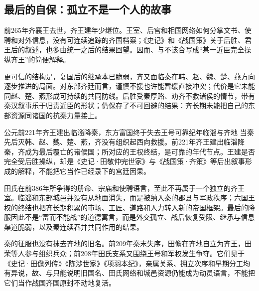 \subsection{最后的自保：孤立不是一个人的故事}

前265年齐襄王去世，齐王建年少继位。王室、后宫和相国网络如何分掌文书、使聘和对外信息，没有可连续追踪的齐国档案；《史记》和《战国策》关于后胜、君王后的叙述，也多由统一之后的结果回望。因而、与不该合写成“某一近臣完全操纵齐王”的简便解释。

更可信的结构是，复国后的继承本已脆弱，齐又面临秦在韩、赵、魏、楚、燕方向逐步推进的局面。对东部齐廷而言，谨慎不援也许能暂缓直接冲突；代价是它未能同赵、楚、燕形成可持续的共同防线。后胜受秦厚赂、劝齐不救诸侯的情节，带有秦汉叙事乐于归责近臣的形状；仍保存了不可回避的结果：齐长期未能把自己的东部资源同诸国的抗秦力量接上。

\begin{event}{公元前221年}{齐王建出临淄降秦，东方富国终于失去王号}{可靠纪年}{临淄与齐地}
当秦先后灭韩、赵、魏、楚、燕，齐没有组织起西向救援。前221年齐王建出临淄降秦，齐成为最后覆亡的诸侯国；所对应的王权终结，是可靠的年代节点。王建是否完全受后胜操纵，却是《史记·田敬仲完世家》与《战国策·齐策》等后出叙事形成的解释，不能把它当作已经录下的宫廷因果。

田氏在前386年所争得的册命、宗庙和使聘语言，至此不再属于一个独立的齐王室。临淄和东部城邑并没有从地面消失，而是被纳入秦的郡县与军政秩序；六国王权的终结也把齐长期积累的市场、工匠、道路和人力转入新的帝国框架。最后的降服因此不是“富而不能战”的道德寓言，而是外交孤立、战后恢复受限、继承与信息渠道脆弱，以及秦连续吞并共同作用的结果。
\end{event}

秦的征服也没有抹去齐地的旧名。前209年秦末失序，田儋在齐地自立为齐王，田荣等人参与组织兵众；前208年田氏支系又围绕王号和军权发生争夺。它们见于《史记·田儋列传》《陈涉世家》《项羽本纪》，亲属关系、拥立次序和早期分工均有异说，故、与只能说明旧国名、田氏网络和城邑资源仍能成为动员语言，不能把它们当作战国齐国原封不动地复活。

